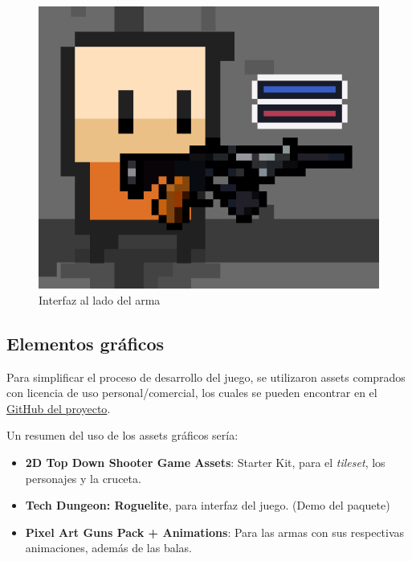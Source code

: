 \documentclass[12pt]{article}
\begin{document}
        \begin{figure}[H]
            \centering
            \includegraphics[scale = 0.5]{Images/UI descartada.png}
            \caption{Interfaz al lado del arma}
            \label{fig:UI descartada}
        \end{figure}
        
    \subsection{Elementos gráficos}
        
        Para simplificar el proceso de desarrollo del juego, se utilizaron assets comprados con licencia de uso personal/comercial, los cuales se pueden encontrar en el \href{https://github.com/JesusJMUJI/TopDownShooterGame}{GitHub del proyecto}.
        
        Un resumen del uso de los assets gráficos sería:
        \begin{itemize}
            \item \textbf{2D Top Down Shooter Game Assets}: Starter Kit, para el \textit{tileset}, los personajes y la cruceta.
            \item \textbf{Tech Dungeon: Roguelite}, para interfaz del juego. (Demo del paquete)
            \item \textbf{Pixel Art Guns Pack + Animations}: Para las armas con sus respectivas animaciones, además de las balas.
        \end{itemize}
        
\end{document}
